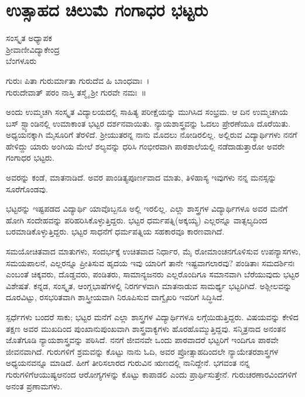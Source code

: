 {\fontsize{14}{16}\selectfont
\chapter{ಉತ್ಸಾಹದ ಚಿಲುಮೆ ಗಂಗಾಧರ ಭಟ್ಟರು}

\begin{center}
\smallskip
ಸಂಸ್ಕೃತ ಅಧ್ಯಾಪಕ\\
ಶ್ರೀವಾಣೀವಿದ್ಯಾಕೇಂದ್ರ\\
ಬೆಂಗಳೂರು
\addrule
\end{center}
\begin{center}
ಗುರುಃ ಪಿತಾ ಗುರುರ್ಮಾತಾ ಗುರುದೆವ ಹಿ ಬಾಂಧವಾಃ~।\\
ಗುರುದೇವಾತ್ ಪರಂ ನಾಸ್ತಿ ತಸ್ಮೈ ಶ್ರೀ ಗುರವೇ ನಮಃ~॥
\end{center}
ಅಂದು ಉಮ್ಮಚಗಿ ಸಂಸ್ಕೃತ ವಿದ್ಯಾಲಯದಲ್ಲಿ ಸಾಹಿತ್ಯ ಪರೀಕ್ಷೆಯನ್ನು ಮುಗಿಸಿದ ಸಂಭ್ರಮ. ಆ ದಿನ ಉಮ್ಮಚಗಿಯ ಬಸ್ ಸ್ಟ್ಯಾಂಡಿನಲ್ಲಿ ಉಮಾಕಾಂತ ಭಟ್ಟರ ದರ್ಶನ\-ವಾಯಿತು. ನ್ಯಾಯಶಾಸ್ತ್ರವನ್ನು ಓದಲು ಪ್ರೇರಣೆಯೂ ದೊರೆಯಿತು. ಅಧ್ಯಯನಕ್ಕಾಗಿ ಮೈಸೂರಿಗೆ ತೆರಳಿದೆ. ಶ್ರೀಯುತರನ್ನ ನಾನು ಮೊದಲು ನೋಡಿರಲಿಲ್ಲ. ಅಲ್ಲಿರುವ ವಿದ್ಯಾರ್ಥಿಗಳು ನನಗೆ ಹೇಳಿದ್ದು  \enginline{-}   ಯಾರು ಅಂಗಿಯ ಮೇಲೆ ಶಲ್ಯವನ್ನು ಧರಿಸಿ ಗಂಭೀರ\-ವಾಗಿ ಪಾಠಶಾಲೆಯಲ್ಲಿ ನಡೆದಾಡುತ್ತಾರೋ ಅವರೇ ಗಂಗಾಧರ ಭಟ್ಟರು.

ಅವರನ್ನು ಕಂಡೆ, ಮಾತನಾಡಿದೆ. ಅವರ ಪಾಂಡಿತ್ಯಪೂರ್ಣವಾದ ಮಾತು, ತಿಳಿಹಾಸ್ಯ ಇವುಗಳು ನನ್ನ ಮನಸ್ಸನ್ನು ಸೂರೆಗೊಂಡವು.

ಭಟ್ಟರನ್ನು ಇಷ್ಟಪಡದ ವಿದ್ಯಾರ್ಥಿ ಯಾವೊಬ್ಬನೂ ಅಲ್ಲಿ ಇರಲಿಲ್ಲ. ಎಲ್ಲಾ ಶಾಸ್ತ್ರಗಳ ವಿದ್ಯಾರ್ಥಿಗಳೂ ಅವರ ಮನೆಗೆ ಹೋಗಿ ಸಂದೇಹವನ್ನು ಪರಿಹರಿಸಿಕೊಳ್ಳುತ್ತಿದ್ದರು. ಭಟ್ಟರ ಧರ್ಮಪತ್ನಿ(ಅಕ್ಕಯ್ಯ) ಎಲ್ಲರನ್ನೂ ವಾತ್ಸಲ್ಯದಿಂದ ಬರಮಾಡಿಕೊಳ್ಳುತ್ತಿದ್ದರು. ಭಟ್ಟರ ಸಾಧನೆಗೆ ಧರ್ಮಪತ್ನಿಯ ಸಹಕಾರವೂ ಕಾರಣವಾಗಿದೆ.

ಸಮಯೋಚಿತವಾದ ಮಾತುಗಳು, ಸಂದರ್ಭಕ್ಕೆ ಉಚಿತವಾದ ನಿರ್ಧಾರ, ಮೈ ರೋಮಾಂಚನಗೊಳಿಸುವ ಉಪನ್ಯಾಸಗಳು, ಸಮಯಪಾಲನೆ, ಎಲ್ಲರನ್ನೂ ಪ್ರೀತಿಸುವ ಹೃದಯ ಇವು ಯಾರಿಗೆ ತಾನೇ ಇಷ್ಟವಾಗಲಾರವು? ಪಂಡಿತಾಃ ಸಮದರ್ಶಿನಃ ಎಂಬಂತೆ ಚಿಕ್ಕವರು, ದೊಡ್ಡವರು, ಪಂಡಿತರು, ಸಾಮಾನ್ಯಜನರು ಎಲ್ಲರೊಂದಿಗೂ ಸಮಾನವಾಗಿ ಬೆರೆಯುವುದು ಭಟ್ಟರ ವಿಶೇಷತೆ. ಕನ್ನಡ, ಸಂಸ್ಕೃತ, ಆಂಗ್ಲಭಾಷೆಗಳಲ್ಲಿ ನಿರರ್ಗಳವಾಗಿ ಮಾತನಾಡುವ ಸಾಮರ್ಥ್ಯ ಭಟ್ಟರಿಗಿದೆ. ಅಶ್ಲೀಲವನ್ನು ದೂರವಿಟ್ಟು, ರಸಭರಿತವಾಗಿ ಶಾಸ್ತ್ರೀಯವಾಗಿ ನಿರೂಪಿಸುವ ವಾಗ್ವೈಖರಿ ಇವರಿಗೆ ಸಿದ್ಧಿಸಿದೆ.

ಸ್ಪರ್ಧೆಗಳು ಬಂದರೆ ಸಾಕು; ಭಟ್ಟರ ಮನೆಗೆ ಎಲ್ಲಾ ಶಾಸ್ತ್ರಗಳ ವಿದ್ಯಾರ್ಥಿಗಳೂ ಲಗ್ಗೆಯಿಡುತ್ತಿದ್ದರು. ವಿಷಯವನ್ನು ಕೇಳಿದ ತಕ್ಷಣ ಅವರ ಮುಖದಿಂದ ಪುಂಖಾನುಪುಂಖವಾಗಿ ಶಾಸ್ತ್ರವಾಕ್ಯಗಳು ಹೊರಹೊಮ್ಮುತ್ತಿದ್ದವು. ಸನ್ಮಿತ್ರನಾದ ಅನಂತನ ಜೊತೆಗೂಡಿ ನ್ಯಾಯಶಾಸ್ತ್ರವನ್ನು ಪಠಿಸಿದೆ. ನನಗೆ ಜೀವನವೇ ಒಂದು ಪಾಠವಾದರೆ ಭಟ್ಟರಿಗೆ ಇಂದಿಗೂ ಪಾಠವೇ ಜೀವನವಾಗಿದೆ. ಗುರುಗಳಿಗೆ ಶ್ರಮವನ್ನು ಕೊಟ್ಟು ನಾನು ಓದಿ, ಅವರ ಪ್ರೋತ್ಸಾಹದಿಂದಲೇ ನ್ಯಾಯೇತರಶಾಸ್ತ್ರಗಳ ಅಧ್ಯಯನವನ್ನೂ ಮಾಡಿದೆ. ಹೀಗೆ ತೀರಿಸಲಾರದ ಗುರುವಿನ ಋಣದಲ್ಲಿ ನಾನಿದ್ದೇನೆ. ಭಗವಂತ ನನ್ನ ಗುರುಗಳಿಗೆ\break ಆಯುಷ್ಯಆನಂದ ಆರೋಗ್ಯಗಳನ್ನು ಕೊಟ್ಟು ಕಾಪಾಡಲಿ ಎಂದು ಪ್ರಾರ್ಥಿಸುತ್ತೇನೆ. ಗುರುಚರಣಾರವಿಂದಗಳಿಗೆ ಅನಂತ ಪ್ರಣಾಮಗಳು.

\articleend	
}
